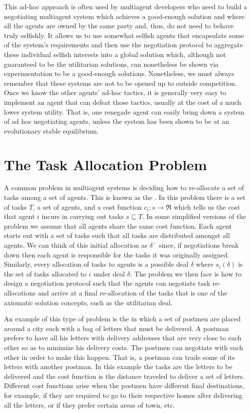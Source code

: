 This ad-hoc approach is often used by multiagent developers who need
to build a negotiating multiagent system which achieves a good-enough
solution and where all the agents are owned by the same party and,
thus, do not need to behave truly selfishly. It allows us to use
somewhat selfish agents that encapsulate some of the system's
requirements and then use the negotiation protocol to aggregate these
individual selfish interests into a global solution which, although
not guaranteed to be the utilitarian solutions, can nonetheless be
shown via experimentation to be a good-enough solutions. Nonetheless,
we must always remember that these systems are not to be opened up to
outside competition. Once we know the other agents' ad-hoc tactics, it
is generally very easy to implement an agent that can defeat those
tactics, usually at the cost of a much lower system utility. That is,
one renegade agent can easily bring down a system of ad hoc
negotiating agents, unless the system has been shown to be at an
evolutionary stable equilibrium.


\section{The Task Allocation Problem}
\label{sec:task-alloc-probl}

A common problem in multiagent systems is deciding how to re-allocate
a set of tasks among a set of agents. This is known as the . In this problem there is a set of tasks $T$, a
set of agents, and a cost function $c_i: s \rightarrow \Re$ which
tells us the cost that agent $i$ incurs in carrying out tasks $s
\subseteq T$. In some simplified versions of the problem we assume
that all agents share the same cost function. Each agent starts out
with a set of tasks such that all tasks are distributed amongst all
agents. We can think of this initial allocation as $\delta^-$ since,
if negotiations break down then each agent is responsible for the
tasks it was originally assigned. Similarly, every allocation of tasks
to agents is a possible deal $\delta$ where $s_i(\delta)$ is the set
of tasks allocated to $i$ under deal $\delta$. The problem we then
face is how to design a negotiation protocol such that the agents can
negotiate task re-allocations and arrive at a final re-allocation of
the tasks that is one of the axiomatic solution concepts, such as the
utilitarian deal.

An example of this type of problem is the  in
which a set of postmen are placed around a city each with a bag of
letters that must be delivered.  A postman prefers to have all his
letters with delivery addresses that are very close to each other so
as to minimize his delivery costs. The postmen can negotiate with each
other in order to make this happen. That is, a postman can trade some
of its letters with another postman. In this example the tasks are the
letters to be delivered and the cost function is the distance traveled
to deliver a set of letters. Different cost functions arise when the
postmen have different final destinations, for example, if they are
required to go to their respective homes after delivering all the
letters, or if they prefer certain areas of town, etc.



